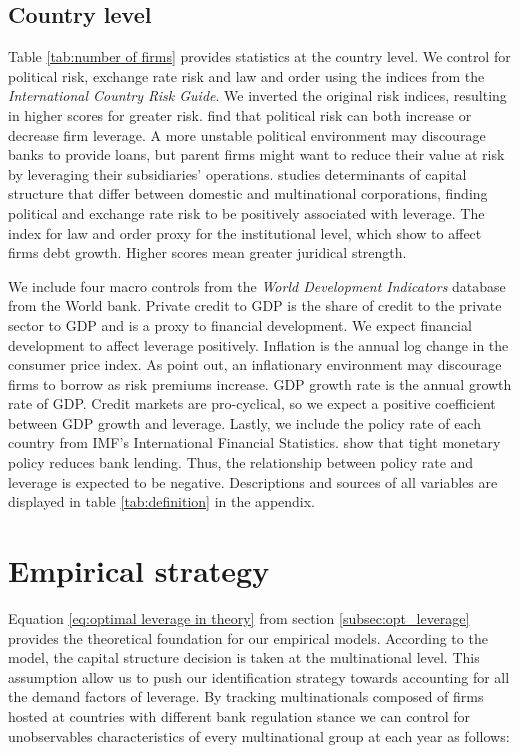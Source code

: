 \documentclass[12pt]{article}
\begin{document}
\subsection{Country level} 
 \label{subsec:country}
	Table \ref{tab:number of firms} provides statistics at the country level. We control for political risk, exchange rate risk and law and order using the indices from the \textit{International Country Risk Guide}. We inverted the original risk indices, resulting in higher scores for greater risk. \cite*{kesternich2010afraid} find that political risk can both increase or decrease firm leverage. A more unstable political environment may discourage banks to provide loans, but parent firms might want to reduce their value at risk by leveraging their subsidiaries' operations. \cite*{burgman1996empirical} studies determinants of capital structure that differ between domestic and multinational corporations, finding political and exchange rate risk to be positively associated with leverage. The index for law and order proxy for the institutional level, which \cite*{demirgucc1998law} show to affect firms debt growth. Higher scores mean greater juridical strength.
	
	 We include four macro controls from the \textit{World Development Indicators} database from the World bank. Private credit to GDP is the share of credit to the private sector to GDP and is a proxy to financial development. We expect financial development to affect leverage positively. Inflation is the annual log change in the consumer price index. As \cite{huizinga2008capital} point out, an inflationary environment may discourage firms to borrow as risk premiums increase. GDP growth rate is the annual growth rate of GDP. Credit markets are pro-cyclical, so we expect a positive coefficient between GDP growth and leverage. Lastly, we include the policy rate of each country from IMF's International Financial Statistics. \cite*{jimenez2012credit} show that tight monetary policy reduces bank lending. Thus, the relationship between policy rate and leverage is expected to be negative. Descriptions and sources of all variables are displayed in table \ref{tab:definition} in the appendix.
			
	\section{Empirical strategy}
	\label{sec:strategy}
	Equation \ref{eq:optimal leverage in theory} from section \ref{subsec:opt_leverage} provides the theoretical foundation for our empirical models. According to the model, the capital structure decision is taken at the multinational level. This assumption allow us to push our identification strategy towards accounting for all the demand factors of leverage. By tracking multinationals composed of firms hosted at countries with different bank regulation stance we can control for unobservables characteristics of every multinational group at each year as follows:   
	
\end{document}
